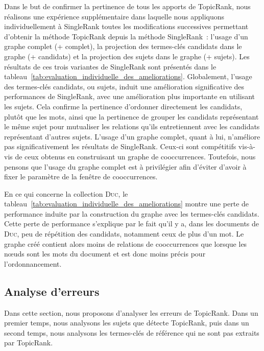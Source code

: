         Dans le but de confirmer la pertinence de tous les apports de TopicRank,
        nous réalisons une expérience supplémentaire dans laquelle nous
        appliquons individuellement à SingleRank toutes les modifications
        successives permettant d'obtenir la méthode TopicRank depuis la méthode
        SingleRank~: l'usage d'un graphe complet (+ complet), la projection des
        termes-clés candidats dans le graphe (+ candidats) et la projection des
        sujets dans le graphe (+ sujets). Les résultats de ces trois variantes
        de SingleRank sont présentés dans le
        tableau~\ref{tab:evaluation_individuelle_des_ameliorations}.
        Globalement, l'usage des termes-clés candidats, ou sujets, induit une
        amélioration significative des performances de SingleRank, avec une
        amélioration plus importante en utilisant les sujets. Cela confirme la
        pertinence d'ordonner directement les candidats, plutôt que les mots,
        ainsi que la pertinence de grouper les candidats représentant le même
        sujet pour mutualiser les relations qu'ils entretiennent avec les
        candidats représentant d'autres sujets. L'usage d'un graphe complet,
        quant à lui, n'améliore pas significativement les résultats de
        SingleRank. Ceux-ci sont compétitifs vis-à-vis de ceux obtenus en
        construisant un graphe de cooccurrences. Toutefois, nous pensons que
        l'usage du graphe complet est à privilégier afin d'éviter d'avoir à
        fixer le paramètre de la fenêtre de cooccurrences.
        
        En ce qui concerne la collection \textsc{Duc}, le
        tableau~\ref{tab:evaluation_individuelle_des_ameliorations} montre une
        perte de performance induite par la construction du graphe avec les
        termes-clés candidats. Cette perte de performance s'explique par le fait
        qu'il y a, dans les documents de \textsc{Duc}, peu de répétition des
        candidats, notamment ceux de plus d'un mot. Le graphe créé contient
        alors moins de relations de cooccurrences que lorsque les n\oe{}uds sont
        les mots du document et est donc moins précis pour l'ordonnancement.

      \subsection{Analyse d'erreurs}
      \label{subsec:main:domain_independent_keyphrase_extraction-unsupervised_automatic_keyphrase_extraction-error_analysis}
        Dans cette section, nous proposons d'analyser les erreurs de TopicRank.
        Dans un premier temps, nous analysons les sujets que détecte TopicRank,
        puis dans un second temps, nous analysons les termes-clés de référence
        qui ne sont pas extraits par Topic\-Rank.

